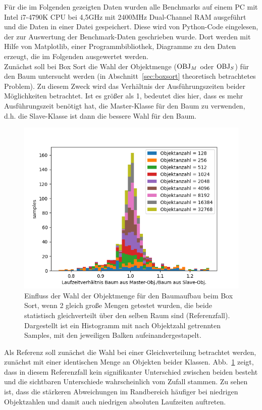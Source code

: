 Für die im Folgenden gezeigten Daten wurden alle Benchmarks auf einem PC mit Intel i7-4790K CPU bei 4,5GHz mit 2400MHz Dual-Channel RAM ausgeführt und die Daten in einer Datei gespeichert. Diese wird von Python-Code eingelesen, der zur Auswertung der Benchmark-Daten geschrieben wurde. Dort werden mit Hilfe von Matplotlib, einer Programmbibliothek, Diagramme zu den Daten erzeugt, die im Folgenden ausgewertet werden.\\


Zunächst soll bei Box Sort die Wahl der Objektmenge ($\operatorname{OBJ}_M$ oder $\operatorname{OBJ}_S$) für den Baum untersucht werden (in Abschnitt~\ref{sec:boxsort} theoretisch betrachtetes Problem). Zu diesem Zweck wird das Verhältnis der Ausführungszeiten beider Möglichkeiten betrachtet. Ist es größer als 1, bedeutet dies hier, dass es mehr Ausführungszeit benötigt hat, die Master-Klasse für den Baum zu verwenden, d.h. die Slave-Klasse ist dann die bessere Wahl für den Baum.\\
\begin{figure}
    \centering
    \includegraphics[width=1.0\textwidth]{./res/boxsortChoice-reference.png}
    \caption{Einfluss der Wahl der Objektmenge für den Baumaufbau beim Box Sort, wenn 2 gleich große Mengen getestet wurden, die beide statistisch gleichverteilt über den selben Raum sind (Referenzfall).  Dargestellt ist ein Histogramm mit nach Objektzahl getrennten Samples, mit den jeweiligen Balken aufeinandergestapelt.}
    \label{fig:boxsortCoice-reference}
\end{figure}
Als Referenz soll zunächst die Wahl bei einer Gleichverteilung betrachtet werden, zunächst mit einer identischen Menge an Objekten beider Klassen. Abb.~\ref{fig:boxsortCoice-reference} zeigt, dass in diesem Referenzfall kein signifikanter Unterschied zwischen beiden besteht und die sichtbaren Unterschiede wahrscheinlich vom Zufall stammen. Zu sehen ist, dass die stärkeren Abweichungen im Randbereich häufiger bei niedrigen Objektzahlen und damit auch niedrigen absoluten Laufzeiten auftreten.\\


